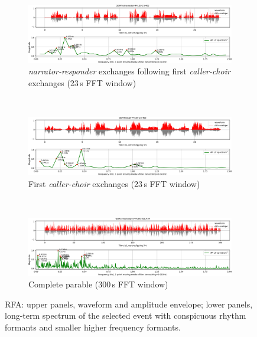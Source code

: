 \documentclass[output=paper,colorlinks,citecolor=brown]{langscibook}
\begin{document}
\begin{figure}
    \begin{subfigure}{\textwidth}
    \includegraphics[width=\textwidth]{gibbon_figure06A.png}
    \caption{\textit{narrator-responder} exchanges following first \textit{caller-choir} exchanges (23\,s FFT window)}
    \label{fig:fig06a}
    \end{subfigure}\medskip\\
    \begin{subfigure}{\textwidth}
    \includegraphics[width=\textwidth]{gibbon_figure06B.png}
    \caption{First \textit{caller-choir} exchanges (23\,s FFT window)}
    \label{fig:fig06b}
    \end{subfigure}\medskip\\
    \begin{subfigure}{\textwidth}
    \includegraphics[width=\textwidth]{gibbon_figure06C.png}
    \caption{Complete parable (300\,s FFT window)}
    \label{fig:fig06c}
    \end{subfigure}
\caption{\label{fig:fig06}RFA: upper panels, waveform and amplitude envelope; lower panels, long-term spectrum of the selected event with conspicuous rhythm formants and smaller higher frequency formants.}
\end{figure}
\end{document}
